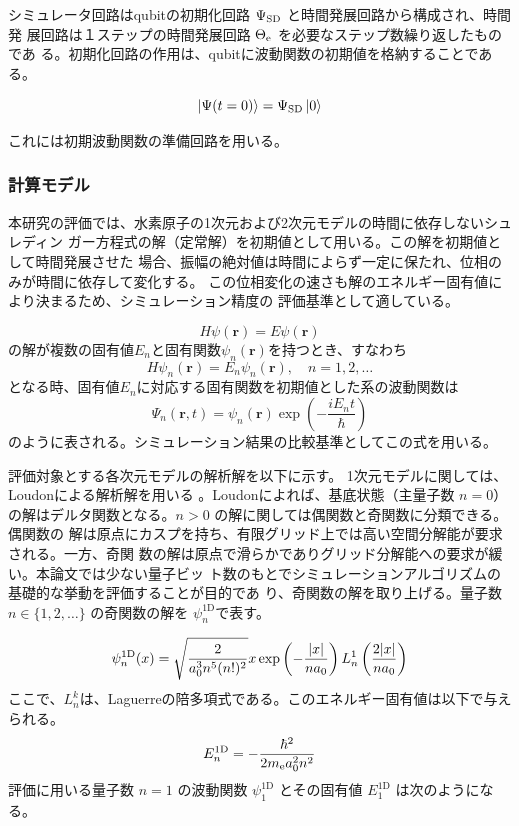 \documentclass[wabun2025.tex]{subfiles}
\begin{document}
シミュレータ回路はqubitの初期化回路 $\Psi_{\mathrm{SD}}$ と時間発展回路から構成され、時間発
展回路は１ステップの時間発展回路 $\Theta_{\mathrm{e}}$ を必要なステップ数繰り返したものであ
る。初期化回路の作用は、qubitに波動関数の初期値を格納することである。

\begin{equation}
\ket{\Psi(t=0)} = \Psi_{\mathrm{SD}} \ket{0}
\end{equation}

これには初期波動関数の準備回路を用いる\cite[Sec. 2.2]{takahashi2024.doi:10.1021/acs.jctc.4c00708}。

\subsubsection{計算モデル}
本研究の評価では、水素原子の1次元および2次元モデルの時間に依存しないシュレディン
ガー方程式の解（定常解）を初期値として用いる。この解を初期値として時間発展させた
場合、振幅の絶対値は時間によらず一定に保たれ、位相のみが時間に依存して変化する。
この位相変化の速さも解のエネルギー固有値により決まるため、シミュレーション精度の
評価基準として適している。

\begin{equation}
H\psi(\bm{r})=E\psi(\bm{r})
\end{equation}
の解が複数の固有値$E_n$と固有関数$\psi_n(\bm{r})$を持つとき、すなわち
\begin{equation}
H\psi_n(\bm{r})=E_n\psi_n(\bm{r}),\quad n=1,2,\ldots
\end{equation}
となる時、固有値$E_n$に対応する固有関数を初期値とした系の波動関数は
\begin{equation}
\Psi_n(\bm{r},t)=\psi_n(\bm{r})\exp\left(-\frac{iE_nt}{\hbar}\right)
\end{equation}
のように表される。シミュレーション結果の比較基準としてこの式を用いる。

評価対象とする各次元モデルの解析解を以下に示す。
1次元モデルに関しては、Loudonによる解析解を用いる
\cite{Loudon1959.10.1119/1.1934950}。Loudonによれば、基底状態（主量子数 $n=0$）
の解はデルタ関数となる。$n>0$ の解に関しては偶関数と奇関数に分類できる。偶関数の
解は原点にカスプを持ち、有限グリッド上では高い空間分解能が要求される。一方、奇関
数の解は原点で滑らかでありグリッド分解能への要求が緩い。本論文では少ない量子ビッ
ト数のもとでシミュレーションアルゴリズムの基礎的な挙動を評価することが目的であ
り、奇関数の解を取り上げる。量子数$n\in\{1,2,\ldots\}$ の奇関数の解を
$\psi_n^{\mathrm{1D}}$で表す。

\begin{equation}
\psi_n^{\mathrm{1D}}(x)=\sqrt{\frac{2}{a_0^3n^5(n!)^2}}
x\exp\left(-\frac{{\left| x \right|}}{na_0}\right)L_n^1\left(\frac{2{\left| x \right|}}{na_0}\right)
\end{equation}
ここで、$L_n^k$は、Laguerreの陪多項式である。このエネルギー固有値は以下で与えられる。
\begin{equation}
    E_n^{\mathrm{1D}}=-\frac{\hbar^2}{2m_{\mathrm{e}} a_0^2 n^2}
\end{equation}
評価に用いる量子数 $n=1$ の波動関数 $\psi_1^{\mathrm{1D}}$ とその固有値
$E_1^{\mathrm{1D}}$ は次のようになる。
\end{document}
